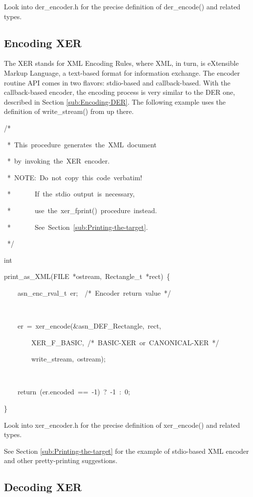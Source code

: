 \documentclass[english,oneside,12pt]{book}
\newenvironment{lyxcode}
{\par\begin{list}{}{
\setlength{\rightmargin}{\leftmargin}
\setlength{\listparindent}{0pt}%
\raggedright
\setlength{\itemsep}{0pt}
\setlength{\parsep}{0pt}
\normalfont\ttfamily}%
 \item[]}
{\end{list}}
\begin{document}
Look into der\_encoder.h for the precise definition of der\_encode()
and related types.


\subsection{\label{sub:Encoding-XER}Encoding XER}

The XER stands for XML Encoding Rules, where XML, in turn, is eXtensible
Markup Language, a text-based format for information exchange. The
encoder routine API comes in two flavors: stdio-based and callback-based.
With the callback-based encoder, the encoding process is very similar
to the DER one, described in Section \vref{sub:Encoding-DER}. The
following example uses the definition of write\_stream() from up there.
\begin{lyxcode}
/{*}

~{*}~This~procedure~generates~the~XML~document

~{*}~by~invoking~the~XER~encoder.

~{*}~NOTE:~Do~not~copy~this~code~verbatim!

~{*}~~~~~~~If~the~stdio~output~is~necessary,

~{*}~~~~~~~use~the~xer\_fprint()~procedure~instead.

~{*}~~~~~~~See~Section~\vref{sub:Printing-the-target}.

~{*}/

int

print\_as\_XML(FILE~{*}ostream,~Rectangle\_t~{*}rect)~\{

~~~~asn\_enc\_rval\_t~er;~~/{*}~Encoder~return~value~{*}/

~

~~~~er~=~xer\_encode(\&asn\_DEF\_Rectangle,~rect,

~~~~~~~~XER\_F\_BASIC,~/{*}~BASIC-XER~or~CANONICAL-XER~{*}/

~~~~~~~~write\_stream,~ostream);

~

~~~~return~(er.encoded~==~-1)~?~-1~:~0;

\}
\end{lyxcode}
Look into xer\_encoder.h for the precise definition of xer\_encode()
and related types.

See Section \ref{sub:Printing-the-target} for the example of stdio-based
XML encoder and other pretty-printing suggestions.


\subsection{\label{sub:Decoding-XER}Decoding XER}
\end{document}
